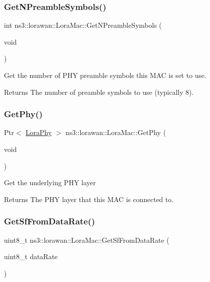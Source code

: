 \subsubsection{\texorpdfstring{Get\+N\+Preamble\+Symbols()}{GetNPreambleSymbols()}}
{\footnotesize\ttfamily int ns3\+::lorawan\+::\+Lora\+Mac\+::\+Get\+N\+Preamble\+Symbols (\begin{DoxyParamCaption}\item[{void}]{ }\end{DoxyParamCaption})}

Get the number of P\+HY preamble symbols this M\+AC is set to use.

\begin{DoxyReturn}{Returns}
The number of preamble symbols to use (typically 8). 
\end{DoxyReturn}
\mbox{\label{classns3_1_1lorawan_1_1LoraMac_a991b6aa211889b6321e64f772c64cbfc}} 
\subsubsection{\texorpdfstring{Get\+Phy()}{GetPhy()}}
{\footnotesize\ttfamily Ptr$<$ \hyperlink{classns3_1_1lorawan_1_1LoraPhy}{Lora\+Phy} $>$ ns3\+::lorawan\+::\+Lora\+Mac\+::\+Get\+Phy (\begin{DoxyParamCaption}\item[{void}]{ }\end{DoxyParamCaption})}

Get the underlying P\+HY layer

\begin{DoxyReturn}{Returns}
The P\+HY layer that this M\+AC is connected to. 
\end{DoxyReturn}
\mbox{\label{classns3_1_1lorawan_1_1LoraMac_ae35eb49a530a0e339340959bcd2413e8}} 
\subsubsection{\texorpdfstring{Get\+Sf\+From\+Data\+Rate()}{GetSfFromDataRate()}}
{\footnotesize\ttfamily uint8\+\_\+t ns3\+::lorawan\+::\+Lora\+Mac\+::\+Get\+Sf\+From\+Data\+Rate (\begin{DoxyParamCaption}\item[{uint8\+\_\+t}]{data\+Rate }\end{DoxyParamCaption})}

